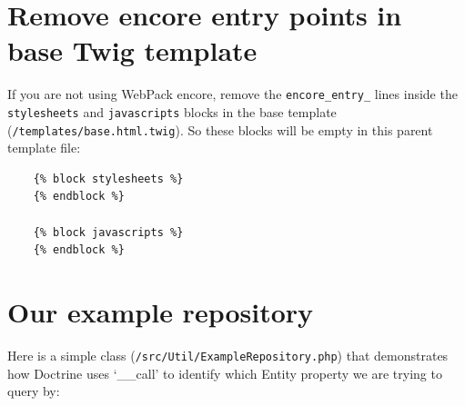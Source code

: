 \documentclass[a4paperpaper,openright]{book}
\begin{document}
\hypertarget{remove-encore-entry-points-in-base-twig-template-2}{%
\section{Remove encore entry points in base Twig
template}\label{remove-encore-entry-points-in-base-twig-template-2}}

If you are not using WebPack encore, remove the \texttt{encore\_entry\_}
lines inside the \texttt{stylesheets} and \texttt{javascripts} blocks in
the base template (\texttt{/templates/base.html.twig}). So these blocks
will be empty in this parent template file:

\begin{verbatim}
    {% block stylesheets %}
    {% endblock %}

    {% block javascripts %}
    {% endblock %}
\end{verbatim}

\hypertarget{our-example-repository}{%
\section{Our example repository}\label{our-example-repository}}

Here is a simple class (\texttt{/src/Util/ExampleRepository.php}) that
demonstrates how Doctrine uses `\_\_call' to identify which Entity
property we are trying to query by:
\end{document}
